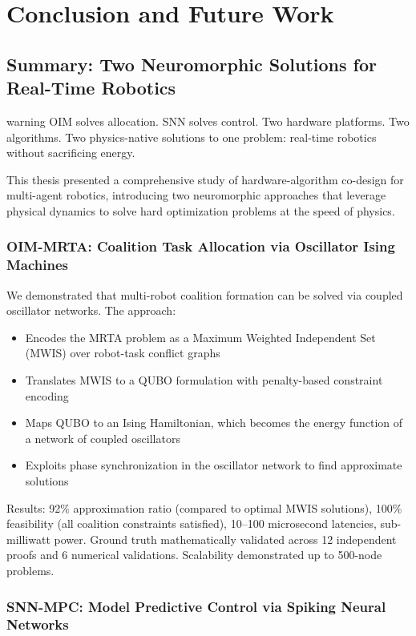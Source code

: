 \chapter{Conclusion and Future Work}
\label{ch:conclusion}

\section{Summary: Two Neuromorphic Solutions for Real-Time Robotics}
\begin{block}{warning}
OIM solves allocation. SNN solves control. Two hardware platforms. Two algorithms. Two physics-native solutions to one problem: real-time robotics without sacrificing energy.
\end{block}


This thesis presented a comprehensive study of hardware-algorithm co-design for multi-agent robotics, introducing two neuromorphic approaches that leverage physical dynamics to solve hard optimization problems at the speed of physics.

\subsection{OIM-MRTA: Coalition Task Allocation via Oscillator Ising Machines}

We demonstrated that multi-robot coalition formation can be solved via coupled oscillator networks. The approach:
\begin{itemize}
\item Encodes the MRTA problem as a Maximum Weighted Independent Set (MWIS) over robot-task conflict graphs
\item Translates MWIS to a QUBO formulation with penalty-based constraint encoding
\item Maps QUBO to an Ising Hamiltonian, which becomes the energy function of a network of coupled oscillators
\item Exploits phase synchronization in the oscillator network to find approximate solutions
\end{itemize}

Results: 92\% approximation ratio (compared to optimal MWIS solutions), 100\% feasibility (all coalition constraints satisfied), 10--100 microsecond latencies, sub-milliwatt power. Ground truth mathematically validated across 12 independent proofs and 6 numerical validations. Scalability demonstrated up to 500-node problems.

\subsection{SNN-MPC: Model Predictive Control via Spiking Neural Networks}

